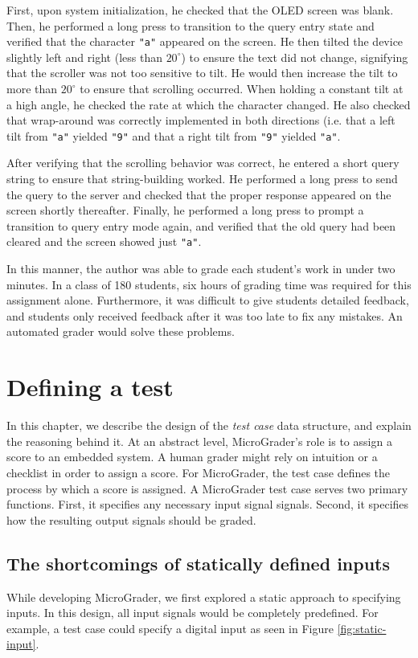 \documentclass[12pt]{article}
\begin{document}
First, upon system initialization, he checked that the OLED screen was blank.  Then, he performed a long press to transition to the query entry state and verified that the character \texttt{"a"} appeared on the screen.  He then tilted the device slightly left and right (less than $20^{\circ}$) to ensure the text did not change, signifying that the scroller was not too sensitive to tilt.  He would then increase the tilt to more than $20^{\circ}$ to ensure that scrolling occurred.  When holding a constant tilt at a high angle, he checked the rate at which the character changed.  He also checked that wrap-around was correctly implemented in both directions (i.e. that a left tilt from \texttt{"a"} yielded \texttt{"9"} and that a right tilt from \texttt{"9"} yielded \texttt{"a"}.

After verifying that the scrolling behavior was correct, he entered a short query string to ensure that string-building worked.  He performed a long press to send the query to the server and checked that the proper response appeared on the screen shortly thereafter.  Finally, he performed a long press to prompt a transition to query entry mode again, and verified that the old query had been cleared and the screen showed just \texttt{"a"}.

In this manner, the author was able to grade each student's work in under two minutes.  In a class of 180 students, six hours of grading time was required for this assignment alone.  Furthermore, it was difficult to give students detailed feedback, and students only received feedback after it was too late to fix any mistakes.  An automated grader would solve these problems.

\newpage
\section{Defining a test}
In this chapter, we describe the design of the \textit{test case} data structure, and explain the reasoning behind it.  At an abstract level, MicroGrader's role is to assign a score to an embedded system.  A human grader might rely on intuition or a checklist in order to assign a score.  For MicroGrader, the test case defines the process by which a score is assigned.  A MicroGrader test case serves two primary functions.  First, it specifies any necessary input signal signals.  Second, it specifies how the resulting output signals should be graded.

\subsection{The shortcomings of statically defined inputs}
While developing MicroGrader, we first explored a static approach to specifying inputs.  In this design, all input signals would be completely predefined.  For example, a test case could specify a digital input as seen in Figure \ref{fig:static-input}.
\end{document}
